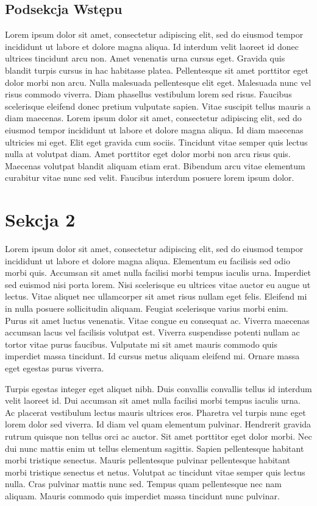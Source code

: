 \documentclass[12pt]{article}
\begin{document}
\subsection{Podsekcja Wstępu}
Lorem ipsum dolor sit amet, consectetur adipiscing elit, sed do eiusmod tempor incididunt ut labore et dolore magna aliqua. Id interdum velit laoreet id donec ultrices tincidunt arcu non. Amet venenatis urna cursus eget. Gravida quis blandit turpis cursus in hac habitasse platea. Pellentesque sit amet porttitor eget dolor morbi non arcu. Nulla malesuada pellentesque elit eget. Malesuada nunc vel risus commodo viverra. Diam phasellus vestibulum lorem sed risus. Faucibus scelerisque eleifend donec pretium vulputate sapien. Vitae suscipit tellus mauris a diam maecenas. Lorem ipsum dolor sit amet, consectetur adipiscing elit, sed do eiusmod tempor incididunt ut labore et dolore magna aliqua. Id diam maecenas ultricies mi eget. Elit eget gravida cum sociis. Tincidunt vitae semper quis lectus nulla at volutpat diam. Amet porttitor eget dolor morbi non arcu risus quis. Maecenas volutpat blandit aliquam etiam erat. Bibendum arcu vitae elementum curabitur vitae nunc sed velit. Faucibus interdum posuere lorem ipsum dolor. 

\section{Sekcja 2}
Lorem ipsum dolor sit amet, consectetur adipiscing elit, sed do eiusmod tempor incididunt ut labore et dolore magna aliqua. Elementum eu facilisis sed odio morbi quis. Accumsan sit amet nulla facilisi morbi tempus iaculis urna. Imperdiet sed euismod nisi porta lorem. Nisi scelerisque eu ultrices vitae auctor eu augue ut lectus. Vitae aliquet nec ullamcorper sit amet risus nullam eget felis. Eleifend mi in nulla posuere sollicitudin aliquam. Feugiat scelerisque varius morbi enim. Purus sit amet luctus venenatis. Vitae congue eu consequat ac. Viverra maecenas accumsan lacus vel facilisis volutpat est. Viverra suspendisse potenti nullam ac tortor vitae purus faucibus. Vulputate mi sit amet mauris commodo quis imperdiet massa tincidunt. Id cursus metus aliquam eleifend mi. Ornare massa eget egestas purus viverra.

Turpis egestas integer eget aliquet nibh. Duis convallis convallis tellus id interdum velit laoreet id. Dui accumsan sit amet nulla facilisi morbi tempus iaculis urna. Ac placerat vestibulum lectus mauris ultrices eros. Pharetra vel turpis nunc eget lorem dolor sed viverra. Id diam vel quam elementum pulvinar. Hendrerit gravida rutrum quisque non tellus orci ac auctor. Sit amet porttitor eget dolor morbi. Nec dui nunc mattis enim ut tellus elementum sagittis. Sapien pellentesque habitant morbi tristique senectus. Mauris pellentesque pulvinar pellentesque habitant morbi tristique senectus et netus. Volutpat ac tincidunt vitae semper quis lectus nulla. Cras pulvinar mattis nunc sed. Tempus quam pellentesque nec nam aliquam. Mauris commodo quis imperdiet massa tincidunt nunc pulvinar.
\end{document}
